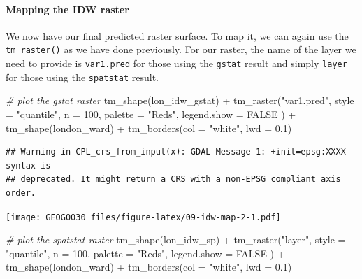 \documentclass[
]{book}
\newenvironment{Shaded}{\begin{snugshade}}{\end{snugshade}}
\newcommand{\AttributeTok}[1]{\textcolor[rgb]{0.77,0.63,0.00}{#1}}
\newcommand{\CommentTok}[1]{\textcolor[rgb]{0.56,0.35,0.01}{\textit{#1}}}
\newcommand{\ConstantTok}[1]{\textcolor[rgb]{0.00,0.00,0.00}{#1}}
\newcommand{\DecValTok}[1]{\textcolor[rgb]{0.00,0.00,0.81}{#1}}
\newcommand{\FloatTok}[1]{\textcolor[rgb]{0.00,0.00,0.81}{#1}}
\newcommand{\FunctionTok}[1]{\textcolor[rgb]{0.00,0.00,0.00}{#1}}
\newcommand{\NormalTok}[1]{#1}
\newcommand{\SpecialCharTok}[1]{\textcolor[rgb]{0.00,0.00,0.00}{#1}}
\newcommand{\StringTok}[1]{\textcolor[rgb]{0.31,0.60,0.02}{#1}}
\begin{document}
\hypertarget{mapping-the-idw-raster}{%
\paragraph{Mapping the IDW raster}\label{mapping-the-idw-raster}}

We now have our final predicted raster surface. To map it, we can again use the \texttt{tm\_raster()} as we have done previously. For our raster, the name of the layer we need to provide is \texttt{var1.pred} for those using the \texttt{gstat} result and simply \texttt{layer} for those using the \texttt{spatstat} result.

\begin{Shaded}
\begin{Highlighting}[]
\CommentTok{\# plot the gstat raster}
\FunctionTok{tm\_shape}\NormalTok{(lon\_idw\_gstat) }\SpecialCharTok{+}
  \FunctionTok{tm\_raster}\NormalTok{(}\StringTok{"var1.pred"}\NormalTok{,}
    \AttributeTok{style =} \StringTok{"quantile"}\NormalTok{, }\AttributeTok{n =} \DecValTok{100}\NormalTok{, }\AttributeTok{palette =} \StringTok{"Reds"}\NormalTok{,}
    \AttributeTok{legend.show =} \ConstantTok{FALSE}
\NormalTok{  ) }\SpecialCharTok{+}
  \FunctionTok{tm\_shape}\NormalTok{(london\_ward) }\SpecialCharTok{+}
  \FunctionTok{tm\_borders}\NormalTok{(}\AttributeTok{col =} \StringTok{"white"}\NormalTok{, }\AttributeTok{lwd =} \FloatTok{0.1}\NormalTok{)}
\end{Highlighting}
\end{Shaded}

\begin{verbatim}
## Warning in CPL_crs_from_input(x): GDAL Message 1: +init=epsg:XXXX syntax is
## deprecated. It might return a CRS with a non-EPSG compliant axis order.
\end{verbatim}

\texttt{[image: GEOG0030\_files/figure-latex/09-idw-map-2-1.pdf]}

\begin{Shaded}
\begin{Highlighting}[]
\CommentTok{\# plot the spatstat raster}
\FunctionTok{tm\_shape}\NormalTok{(lon\_idw\_sp) }\SpecialCharTok{+}
  \FunctionTok{tm\_raster}\NormalTok{(}\StringTok{"layer"}\NormalTok{,}
    \AttributeTok{style =} \StringTok{"quantile"}\NormalTok{, }\AttributeTok{n =} \DecValTok{100}\NormalTok{, }\AttributeTok{palette =} \StringTok{"Reds"}\NormalTok{,}
    \AttributeTok{legend.show =} \ConstantTok{FALSE}
\NormalTok{  ) }\SpecialCharTok{+}
  \FunctionTok{tm\_shape}\NormalTok{(london\_ward) }\SpecialCharTok{+}
  \FunctionTok{tm\_borders}\NormalTok{(}\AttributeTok{col =} \StringTok{"white"}\NormalTok{, }\AttributeTok{lwd =} \FloatTok{0.1}\NormalTok{)}
\end{Highlighting}
\end{Shaded}
\end{document}
